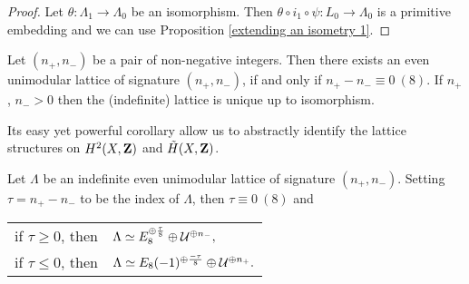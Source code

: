 \begin{proof}
    Let $\theta \colon \Lambda_1 \to \Lambda_0$ be an isomorphism. Then $\theta \circ i_1 \circ \psi \colon L_0 \to \Lambda_0$ is a primitive embedding and we can use Proposition \ref{extending an isometry 1}.
\end{proof}

\begin{theorem}
    \label{Milnor}
    Let $(n_+,n_-)$ be a pair of non-negative integers. Then there exists an even unimodular lattice of signature $(n_+, n_-)$, if and only if $n_+ - n_- \equiv 0 \ (8)$. If $n_+$, $n_- > 0$ then the (indefinite) lattice is unique up to isomorphism.
\end{theorem}



Its easy yet powerful corollary allow us to abstractly identify the lattice structures on $H^{2}(X, \mathbf Z)$ and $\,\tilde{\!{H}}(X, \mathbf Z)$.

\begin{theorem}
    \label{Classification of indefinite even unimodular lattices}
    Let $\Lambda$ be an indefinite even unimodular lattice of signature $(n_+, n_-)$. Setting $\tau = n_+ - n_-$ to be the index of $\Lambda$, then $\tau \equiv 0 \ (8)$ and
    \begin{center}
        \begin{tabular}{r l}
            if $\tau \geq 0$, then & $\Lambda \simeq E_8^{\oplus \frac{\tau}{8}} \oplus \mathcal U^{\oplus n_-},$ \\
            if $\tau \leq 0$, then & $\Lambda \simeq E_8(-1)^{\oplus \frac{-\tau}{8}} \oplus \mathcal U^{\oplus n_+}.$
        \end{tabular}
    \end{center}
\end{theorem}

